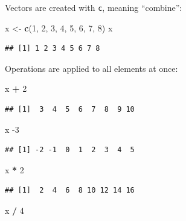 \documentclass[]{book}
\newenvironment{Shaded}{\begin{snugshade}}{\end{snugshade}}
\newcommand{\DecValTok}[1]{\textcolor[rgb]{0.00,0.00,0.81}{#1}}
\newcommand{\KeywordTok}[1]{\textcolor[rgb]{0.13,0.29,0.53}{\textbf{#1}}}
\newcommand{\NormalTok}[1]{#1}
\newcommand{\OperatorTok}[1]{\textcolor[rgb]{0.81,0.36,0.00}{\textbf{#1}}}
\newcommand{\StringTok}[1]{\textcolor[rgb]{0.31,0.60,0.02}{#1}}
\theoremstyle{definition}
\theoremstyle{definition}
\theoremstyle{definition}
\theoremstyle{remark}
\begin{document}
Vectors are created with \texttt{c}, meaning ``combine'':

\begin{Shaded}
\begin{Highlighting}[]
\NormalTok{x <-}\StringTok{ }\KeywordTok{c}\NormalTok{(}\DecValTok{1}\NormalTok{, }\DecValTok{2}\NormalTok{, }\DecValTok{3}\NormalTok{, }\DecValTok{4}\NormalTok{, }\DecValTok{5}\NormalTok{, }\DecValTok{6}\NormalTok{, }\DecValTok{7}\NormalTok{, }\DecValTok{8}\NormalTok{)}
\NormalTok{x}
\end{Highlighting}
\end{Shaded}

\begin{verbatim}
## [1] 1 2 3 4 5 6 7 8
\end{verbatim}

Operations are applied to all elements at once:

\begin{Shaded}
\begin{Highlighting}[]
\NormalTok{x }\OperatorTok{+}\StringTok{ }\DecValTok{2}
\end{Highlighting}
\end{Shaded}

\begin{verbatim}
## [1]  3  4  5  6  7  8  9 10
\end{verbatim}

\begin{Shaded}
\begin{Highlighting}[]
\NormalTok{x }\DecValTok{-3}
\end{Highlighting}
\end{Shaded}

\begin{verbatim}
## [1] -2 -1  0  1  2  3  4  5
\end{verbatim}

\begin{Shaded}
\begin{Highlighting}[]
\NormalTok{x }\OperatorTok{*}\StringTok{ }\DecValTok{2}
\end{Highlighting}
\end{Shaded}

\begin{verbatim}
## [1]  2  4  6  8 10 12 14 16
\end{verbatim}

\begin{Shaded}
\begin{Highlighting}[]
\NormalTok{x }\OperatorTok{/}\StringTok{ }\DecValTok{4}
\end{Highlighting}
\end{Shaded}
\end{document}
